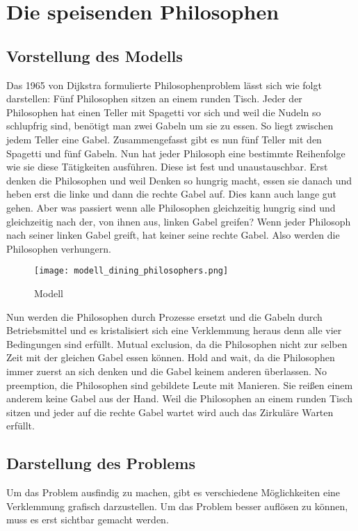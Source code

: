 \chapter{Die speisenden Philosophen}
\label{speisende_philosophen}
\section{Vorstellung des Modells}
\label{vorstellung}
Das 1965 von Dijkstra formulierte Philosophenproblem lässt sich wie folgt darstellen: Fünf Philosophen sitzen an einem runden Tisch. Jeder der Philosophen hat einen Teller mit Spagetti vor sich und weil die Nudeln so schlupfrig sind, benötigt man zwei Gabeln um sie zu essen. So liegt zwischen jedem Teller eine Gabel. Zusammengefasst gibt es nun fünf Teller mit den Spagetti und fünf Gabeln. Nun hat jeder Philosoph eine bestimmte Reihenfolge wie sie diese Tätigkeiten ausführen. Diese ist fest und unaustauschbar. Erst denken die Philosophen und weil Denken so hungrig macht, essen sie danach und heben erst die linke und dann die rechte Gabel auf. Dies kann auch lange gut gehen. Aber was passiert wenn alle Philosophen gleichzeitig hungrig sind und gleichzeitig nach der, von ihnen aus, linken Gabel greifen? Wenn jeder Philosoph nach seiner linken Gabel greift, hat keiner seine rechte Gabel. Also werden die Philosophen verhungern.\parencite[vgl.][S.220]{tanenbaum2016} 

\begin{figure}[H]
\caption{Modell \parencite{philosophers}}
\label{fig:modell}
\centering
\texttt{[image: modell\_dining\_philosophers.png]}
\end{figure}

Nun werden die Philosophen durch Prozesse ersetzt und die Gabeln durch Betriebsmittel und es kristalisiert sich eine Verklemmung heraus denn alle vier Bedingungen sind erfüllt. Mutual exclusion, da die Philosophen nicht zur selben Zeit mit der gleichen Gabel essen können. Hold and wait, da die Philosophen immer zuerst an sich denken und die Gabel keinem anderen überlassen. No preemption, die Philosophen sind gebildete Leute mit Manieren. Sie reißen einem anderem keine Gabel aus der Hand. Weil die Philosophen an einem runden Tisch sitzen und jeder auf die rechte Gabel wartet wird auch das Zirkuläre Warten erfüllt.

\section{Darstellung des Problems}
\label{problem}
Um das Problem ausfindig zu machen, gibt es verschiedene Möglichkeiten eine Verklemmung grafisch darzustellen. Um das Problem besser auflösen zu können, muss es erst sichtbar gemacht werden.

